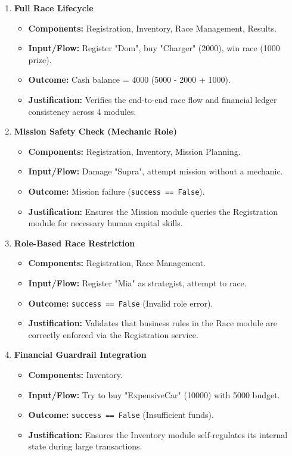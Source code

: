 \documentclass{article}
\begin{document}
\begin{enumerate}
    \item \textbf{Full Race Lifecycle}
    \begin{itemize}
        \item \textbf{Components:} Registration, Inventory, Race Management, Results.
        \item \textbf{Input/Flow:} Register "Dom", buy "Charger" (2000), win race (1000 prize).
        \item \textbf{Outcome:} Cash balance = 4000 (5000 - 2000 + 1000).
        \item \textbf{Justification:} Verifies the end-to-end race flow and financial ledger consistency across 4 modules.
    \end{itemize}

    \item \textbf{Mission Safety Check (Mechanic Role)}
    \begin{itemize}
        \item \textbf{Components:} Registration, Inventory, Mission Planning.
        \item \textbf{Input/Flow:} Damage "Supra", attempt mission without a mechanic.
        \item \textbf{Outcome:} Mission failure (\texttt{success == False}).
        \item \textbf{Justification:} Ensures the Mission module queries the Registration module for necessary human capital skills.
    \end{itemize}

    \item \textbf{Role-Based Race Restriction}
    \begin{itemize}
        \item \textbf{Components:} Registration, Race Management.
        \item \textbf{Input/Flow:} Register "Mia" as strategist, attempt to race.
        \item \textbf{Outcome:} \texttt{success == False} (Invalid role error).
        \item \textbf{Justification:} Validates that business rules in the Race module are correctly enforced via the Registration service.
    \end{itemize}

    \item \textbf{Financial Guardrail Integration}
    \begin{itemize}
        \item \textbf{Components:} Inventory.
        \item \textbf{Input/Flow:} Try to buy "ExpensiveCar" (10000) with 5000 budget.
        \item \textbf{Outcome:} \texttt{success == False} (Insufficient funds).
        \item \textbf{Justification:} Ensures the Inventory module self-regulates its internal state during large transactions.
    \end{itemize}


\end{enumerate}
\end{document}
